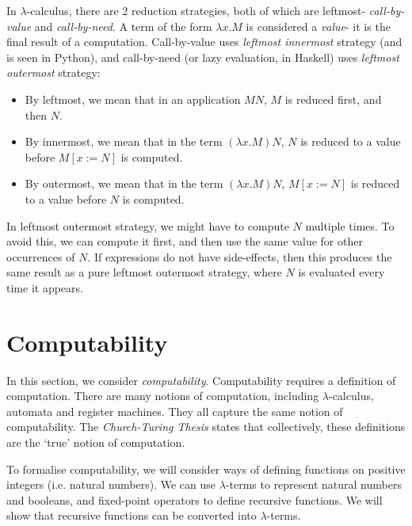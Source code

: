 \documentclass[a4paper, openany]{memoir}
\theoremstyle{definition}
\begin{document}
    In $\lambda$-calculus, there are 2 reduction strategies, both of which are leftmost- \emph{call-by-value} and \emph{call-by-need}. A term of the form $\lambda x.M$ is considered a \emph{value}- it is the final result of a computation. Call-by-value uses \emph{leftmost innermost} strategy (and is seen in Python), and call-by-need (or lazy evaluation, in Haskell) uses \emph{leftmost outermost} strategy:
    \begin{itemize}
        \item By leftmost, we mean that in an application $MN$, $M$ is reduced first, and then $N$.
        \item By innermost, we mean that in the term $(\lambda x.M) N$, $N$ is reduced to a value before $M[x := N]$ is computed.
        \item By outermost, we mean that in the term $(\lambda x.M) N$, $M[x := N]$ is reduced to a value before $N$ is computed. 
    \end{itemize}
    In leftmost outermost strategy, we might have to compute $N$ multiple times. To avoid this, we can compute it first, and then use the same value for other occurrences of $N$. If expressions do not have side-effects, then this produces the same result as a pure leftmost outermost strategy, where $N$ is evaluated every time it appears.
    \newpage

    \section{Computability}
    In this section, we consider \emph{computability}. Computability requires a definition of computation. There are many notions of computation, including $\lambda$-calculus, automata and register machines. They all capture the same notion of computability. The \emph{Church-Turing Thesis} states that collectively, these definitions are the `true' notion of computation.

    To formalise computability, we will consider ways of defining functions on positive integers (i.e. natural numbers). We can use $\lambda$-terms to represent natural numbers and booleans, and fixed-point operators to define recursive functions. We will show that recursive functions can be converted into $\lambda$-terms.
\end{document}
